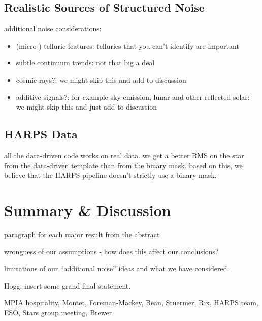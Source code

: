 \documentclass[modern]{aastex61}
\begin{document}
\subsection{Realistic Sources of Structured Noise}

additional noise considerations:
\begin{itemize}
\item (micro-) telluric features: tellurics that you can't identify are important
\item subtle continuum trends: not that big a deal
\item cosmic rays?: we might skip this and add to discussion
\item additive signals?: for example sky emission, lunar and other reflected solar; we might skip this and just add to discussion
\end{itemize}

\subsection{HARPS Data}

all the data-driven code works on real data. we get a better RMS on the star from the data-driven template than from the binary mask. based on this, we believe that the HARPS pipeline doesn't strictly use a binary mask.

\section{Summary \& Discussion}
\label{s:summary}

paragraph for each major result from the abstract

wrongness of our assumptions - how does this affect our conclusions?

limitations of our ``additional noise'' ideas and what we have considered.

Hogg: insert some grand final statement.

\acknowledgements
MPIA hospitality, Montet, Foreman-Mackey, Bean, Stuermer, Rix, HARPS team, ESO, Stars group meeting, Brewer


\end{document}
